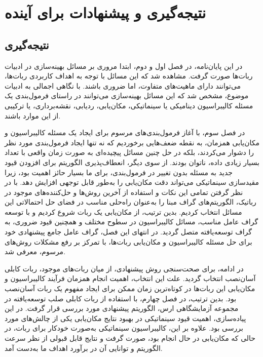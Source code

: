 

\chapter{نتیجه‌گیری و پیشنهادات برای آینده}
\section{نتیجه‌گیری}

در این پایان‌نامه، در فصل اول و دوم، ابتدا مروری بر مسائل بهینه‌سازی در ادبیات ربات‌ها صورت گرفت. مشاهده شد که این مسائل با توجه به اهداف کاربردی ربات‌ها، می‌توانند دارای ماهیت‌های متفاوت، اما ضروری باشند. با نگاهی اجمالی به ادبیات موضوع، مشخص شد که این مسائل بهینه‌سازی می‌توانند در راستای فرمول‌بندی یک مسئله کالیبراسیون دینامیکی یا سینماتیکی، مکان‌یابی، ردیابی، نقشه‌برداری، یا ترکیبی از این موارد باشند.

در فصل سوم، با آغاز فرمول‌بندی‌های مرسوم برای ایجاد یک مسئله کالیبراسیون و مکان‌یابی همزمان، به نقطه ضعف‌هایی برخوردیم که نه تنها ایجاد فرمول‌بندی مورد نظر را دشوار می‌کردند، بلکه در حل چنین مسائل پیچیده‌ای به صورت زمان واقعی با تعداد بسیار زیادی داده، ناتوان بودند. از سوی دیگر، انعطاف‌پذیری الگوریتم برای افزودن قیود جدید به مسئله بدون تغییر در فرمول‌بندی، برای ما بسیار حائز اهمیت بود، زیرا مقیدسازی سینماتیکی می‌تواند دقت مکان‌یابی را به‌طور قابل توجهی افزایش دهد. با در نظر گرفتن تمامی این نکات و استفاده از آخرین روش‌ها و حل‌کننده‌های موجود در رباتیک، الگوریتم‌های گراف مبنا را به‌عنوان راه‌حلی مناسب در فضای حل احتمالاتی این مسائل انتخاب کردیم. بدین ترتیب، از مکان‌یابی یک ربات شروع کردیم و با توسعه گراف عامل مناسب، مسائل کالیبراسیون در سطوح مختلف و همچنین قیود ضروری، به گراف توسعه‌یافته متصل گردید. در انتهای این فصل، گراف عامل جامع پیشنهادی خود برای حل مسئله کالیبراسیون و مکان‌یابی ربات‌ها، با تمرکز بر رفع مشکلات روش‌های مرسوم، معرفی شد.

در ادامه، برای صحت‌سنجی روش پیشنهادی، از میان ربات‌های موجود، ربات کابلی آسان‌نصب انتخاب گردید. علت این انتخاب، اهمیت انجام همزمان فرآیند کالیبراسیون و مکان‌یابی این ربات‌ها در کوتاه‌ترین زمان ممکن برای ایجاد مفهوم یک ربات آسان‌نصب بود. بدین ترتیب، در فصل چهارم، با استفاده از ربات کابلی صلب توسعه‌یافته در مجموعه آزمایشگاهی ارس، الگوریتم پیشنهادی مورد بررسی قرار گرفت. در این پیاده‌سازی، اهمیت قیود سینماتیکی در بهبود نتایج مکان‌یابی یکی از چالش‌های مورد بررسی بود. علاوه بر این، کالیبراسیون سینماتیکی به‌صورت خودکار برای ربات، در حالی که مکان‌یابی در حال انجام بود، صورت گرفت و نتایج قابل قبولی از نظر سرعت الگوریتم و توانایی آن در برآورد اهداف ما به‌دست آمد.

